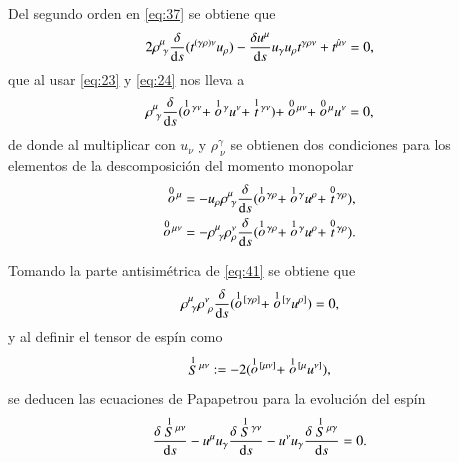 Del segundo orden en \eqref{eq:37} se obtiene que
\begin{equation}
2 \rho^{\mu}_{\ \gamma} \frac{\delta }{\mathrm{d}s}( t^{(\gamma \rho) \nu} u_{\rho} ) - \frac{\delta u^{\mu}}{\mathrm{d}s} u_{\gamma} u_{\rho} t^{\gamma \rho \nu} + t^{\hat{\mu} \nu} = 0,
\end{equation}
que al usar \eqref{eq:23} y \eqref{eq:24} nos lleva a
\begin{equation}
\rho^{\mu}_{\ \gamma} \frac{\delta }{\mathrm{d}s} ( \stackrel{1}{o}{\!}^{\gamma \nu} + \stackrel{1}{o}{\!}^{\gamma} u^{\nu} + \stackrel{1}{t}{\!}^{\gamma \nu} )  + \stackrel{0}{o}{\!}^{\mu \nu}  + \stackrel{0}{o}{\!}^{\mu} u^{\nu} = 0,
\end{equation}
de donde al multiplicar con $u_{\nu}$ y $\rho^{\gamma}_{\ \nu}$ se obtienen dos condiciones para los elementos de la descomposición del momento monopolar
\begin{align}
\label{eq:40}
\des{0}{o}^{\mu} &= -u_{\rho} \rho^{\mu}_{\ \gamma} \cd{} (\des{1}{o}^{\gamma \rho} + \des{1}{o}^{\gamma} u^{\rho} + \des{0}{t}^{\gamma \rho}), \\
\label{eq:41}
\des{0}{o}^{\mu \nu} &= - \rho^{\mu}_{\ \gamma} \rho^{\nu}_{\rho} \cd{} (\des{1}{o}^{\gamma \rho} + \des{1}{o}^{\gamma} u^{\rho} + \des{0}{t}^{\gamma \rho}).
\end{align}

Tomando la parte antisimétrica de \eqref{eq:41} se obtiene que
\begin{equation}
\rho^{\mu}_{\ \gamma} \rho^{\nu}_{\ \rho} \frac{\delta }{\mathrm{d}s} (\stackrel{1}{o}{\!}^{[\gamma \rho]} + \stackrel{1}{o}{\!}^{[\gamma} u^{\rho]}) = 0,
\end{equation}
y al definir el tensor de espín como
\begin{equation}
\label{eq:42}
\stackrel{1}{S}{\!}^{\mu \nu} := -2 (\stackrel{1}{o}{\!}^{[\mu \nu]} + \stackrel{1}{o}{\!}^{[\mu} u^{\nu]}),
\end{equation}
se deducen las ecuaciones de Papapetrou para la evolución del espín
\begin{equation}
\label{eq:83}
\frac{\delta \stackrel{1}{S}{\!}^{\mu \nu}}{\mathrm{d}s} - u^{\mu} u_{\gamma} \frac{\delta \stackrel{1}{S}{\!}^{\gamma \nu}}{\mathrm{d}s} - u^{\nu} u_{\gamma} \frac{\delta \stackrel{1}{S}{\!}^{\mu \gamma}}{\mathrm{d}s} = 0.
\end{equation}

